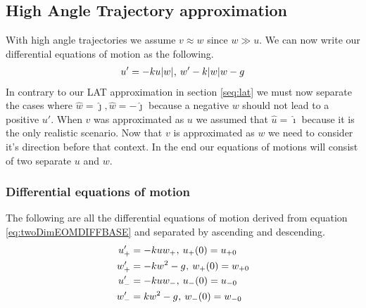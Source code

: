 \documentclass[%
aip,
jmp,
amsmath,amssymb,
reprint,%
]{revtex4-1}
\newcommand{\comma}{\hspace{0.1mm},\hspace{0.7mm}}
\begin{document}
	\subsection{High Angle Trajectory approximation}\label{seq:hat}
	With high angle trajectories we assume $v \approx w$ since $w \gg u$. We can now write our differential equations of motion as the following.
	\begin{align}\label{eq:twoDimEOMDIFFBASE}
		u' = -ku|w| \comma w' -k|w|w-g
	\end{align}
	In contrary to our LAT approximation in section \ref{seq:lat} we must now separate the cases where $\hat{w} = \hat{\jmath}, \hat{w} = -\hat{\jmath}$ because a negative $w$ should not lead to a positive $u'$. When $v$ was approximated as $u$ we assumed that $\hat{u} = \hat{\imath}$ because it is the only realistic scenario. Now that $v$ is approximated as $w$ we need to consider it's direction before that context. In the end our equations of motions will consist of two separate $u$ and $w$.
	\subsubsection{Differential equations of motion}
	The following are all the differential equations of motion derived from equation \eqref{eq:twoDimEOMDIFFBASE} and separated by ascending and descending.
	\begin{align}\label{eq:twoDimEOMHATUP}
		u_{+}' &= -kuw_+ \comma u_+(0) = u_{+0}\\\label{eq:twoDimEOMHATWP}
		w_{+}' &= -kw^2 -g \comma w_+(0) = w_{+0}\\\label{eq:twoDimEOMHATUM}
		u_{-}' &= -kuw_- \comma u_-(0) = u_{-0}\\\label{eq:twoDimEOMHATWM}
		w_{-}' &=  kw^2 -g \comma w_-(0) = w_{-0}
	\end{align}
\end{document}
